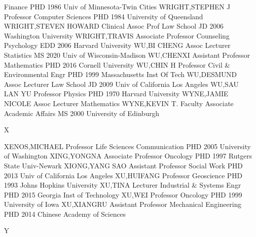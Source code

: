 \documentclass[
]{article}
\begin{document}
\textbar Finance \textbar PHD 1986 Univ of Minnesota-Twin Cities
\textbar WRIGHT,STEPHEN J \textbar{}  \textbar Professor
\textbar Computer Sciences \textbar PHD 1984 University of Queensland
\textbar WRIGHT,STEVEN HOWARD \textbar{}  \textbar Clinical
Assoc Prof \textbar Law School \textbar JD 2006 Washington University
\textbar WRIGHT,TRAVIS \textbar{}  \textbar Associate
Professor \textbar Counseling Psychology \textbar EDD 2006 Harvard
University \textbar WU,BI CHENG \textbar{}  \textbar Assoc
Lecturer \textbar Statistics \textbar MS 2020 Univ of Wisconsin-Madison
\textbar WU,CHENXI \textbar{}  \textbar Assistant Professor
\textbar Mathematics \textbar PHD 2016 Cornell University
\textbar WU,CHIN H \textbar{}  \textbar Professor
\textbar Civil \& Environmental Engr \textbar PHD 1999 Massachusetts
Inst Of Tech \textbar WU,DESMUND \textbar{}  \textbar Assoc
Lecturer \textbar Law School \textbar JD 2009 Univ of California Los
Angeles \textbar WU,SAU LAN YU \textbar{} 
\textbar Professor \textbar Physics \textbar PHD 1970 Harvard University
\textbar WYNE,JAMIE NICOLE \textbar{}  \textbar Assoc
Lecturer \textbar Mathematics \textbar WYNE,KEVIN T. \textbar Faculty
Associate \textbar{}  \textbar Academic Affairs \textbar MS
2000 University of Edinburgh \textbar{}

X

\textbar{}

XENOS,MICHAEL \textbar{}  \textbar Professor \textbar Life
Sciences Communication \textbar PHD 2005 University of Washington
\textbar XING,YONGNA \textbar{}  \textbar Associate
Professor \textbar Oncology \textbar PHD 1997 Rutgers State Univ-Newark
\textbar XIONG,YANG SAO \textbar{}  \textbar Assistant
Professor \textbar Social Work \textbar PHD 2013 Univ of California Los
Angeles \textbar XU,HUIFANG \textbar{}  \textbar Professor
\textbar Geoscience \textbar PHD 1993 Johns Hopkins University
\textbar XU,TINA \textbar{}  \textbar Lecturer
\textbar Industrial \& Systems Engr \textbar PHD 2015 Georgia Inst of
Technology \textbar XU,WEI \textbar{}  \textbar Professor
\textbar Oncology \textbar PHD 1999 University of Iowa
\textbar XU,XIANGRU \textbar{}  \textbar Assistant Professor
\textbar Mechanical Engineering \textbar PHD 2014 Chinese Academy of
Sciences \textbar{}

Y

\textbar{}  \textbar{}
\end{document}
